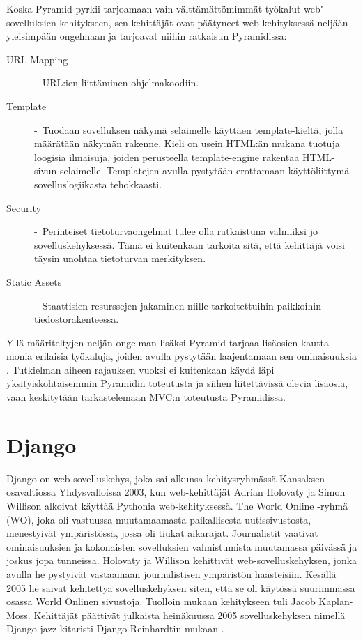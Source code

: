 \documentclass[utf8]{gradu3}
\begin{document}
Koska Pyramid pyrkii tarjoamaan vain välttämättömimmät työkalut web"-sovelluksien kehitykseen, sen kehittäjät
ovat päätyneet web-kehityksessä neljään yleisimpään ongelmaan ja tarjoavat niihin ratkaisun Pyramidissa:

\begin{description}
\item [URL Mapping] -\ URL:ien liittäminen ohjelmakoodiin.
\item[Template] -\ Tuodaan sovelluksen näkymä selaimelle käyttäen template-kieltä, jolla määrätään näkymän rakenne. Kieli on usein HTML:än mukana tuotuja loogisia ilmaisuja, joiden perusteella template-engine rakentaa HTML-sivun selaimelle. Templatejen avulla pystytään erottamaan käyttöliittymä sovelluslogiikasta tehokkaasti.
\item[Security] -\ Perinteiset tietoturvaongelmat tulee olla ratkaistuna valmiiksi jo sovelluskehyksessä. Tämä ei kuitenkaan tarkoita sitä, että kehittäjä voisi täysin unohtaa tietoturvan merkityksen.
\item[Static Assets] -\ Staattisien resurssejen jakaminen niille tarkoitettuihin paikkoihin tiedostorakenteessa.
\end{description}
Yllä määriteltyjen neljän ongelman lisäksi Pyramid tarjoaa lisäosien kautta monia erilaisia työkaluja, joiden avulla pystytään laajentamaan sen ominaisuuksia \parencite{pyramid_intr}. Tutkielman aiheen rajauksen vuoksi ei kuitenkaan
käydä läpi yksityiskohtaisemmin Pyramidin toteutusta ja siihen liitettävissä olevia lisäosia, vaan keskitytään tarkastelemaan MVC:n toteutusta Pyramidissa.

\section{Django}
Django on web-sovelluskehys, joka  sai alkunsa kehitysryhmässä Kansaksen osavaltiossa Yhdysvalloissa 2003, kun web-kehittäjät Adrian Holovaty ja Simon Willison alkoivat käyttää Pythonia web-kehityksessä. The World Online -ryhmä (WO), joka oli vastuussa muutamaamasta paikallisesta uutissivustosta, menestyivät ympäristössä, jossa oli tiukat aikarajat. Journalistit vaativat ominaisuuksien ja kokonaisten sovelluksien valmistumista muutamassa päivässä ja joskus jopa tunneissa. Holovaty ja Willison kehittivät web-sovelluskehyksen, jonka avulla he pystyivät vastaamaan journalistisen ympäristön haasteisiin. Kesällä 2005 he saivat kehitettyä sovelluskehyksen siten, että se oli käytössä suurimmassa osassa World Onlinen sivustoja. Tuolloin mukaan kehitykseen tuli Jacob Kaplan-Moss. Kehittäjät päättivät julkaista heinäkuussa 2005 sovelluskehyksen nimellä Django jazz-kitaristi Django Reinhardtin mukaan \parencite{django_history}.
\end{document}
